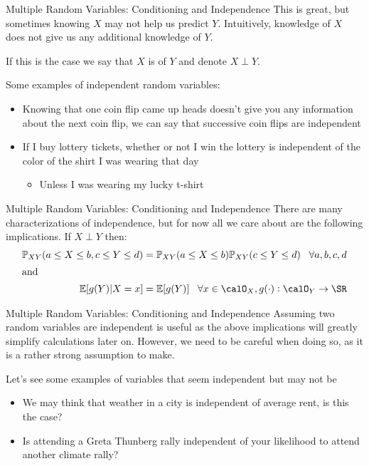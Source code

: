 \documentclass[notheorems,9pt]{beamer}
\begin{document}
\begin{frame}{Multiple Random Variables: Conditioning and Independence} 
	\label{frame:mrv-independence}
	This is great, but sometimes knowing \(X\) may not help us predict \(Y\). Intuitively, knowledge of \(X\) does not give us any additional knowledge of \(Y\). 

	If this is the case we say that \(X\) is  of \(Y\) and denote \(X\perp Y\).

	Some examples of independent random variables:
	\begin{itemize}
		\item<2-> Knowing that one coin flip came up heads doesn't give you any information about the next coin flip, we can say that successive coin flips are independent
		\item<3-> If I buy lottery tickets, whether or not I win the lottery is independent of the color of the shirt I was wearing that day
		\begin{itemize}
			\item<4-> Unless I was wearing my lucky t-shirt
		\end{itemize}
	\end{itemize}
\end{frame}
\begin{frame}{Multiple Random Variables: Conditioning and Independence} 
	\label{frame:mrv-indep-charac}
	There are many characterizations of independence, but for now all we care about are the following implications. If \(X\perp Y\) then:
	\begin{align*}
		\P_{XY}(a\leq X\leq b, c\leq Y\leq d) &= \P_{XY}(a\leq X\leq b)\P_{XY}(c\leq Y\leq d)\;\;\;\forall a,b,c,d\\
		\intertext{and}
		\E[g(Y)|X=x] &= \E[g(Y)]\;\;\;\forall x\in\calO_X, g(\cdot):\calO_Y\to\SR
	\end{align*}
\end{frame}
\begin{frame}{Multiple Random Variables: Conditioning and Independence} 
	\label{frame:mrc-indep-careful}
	Assuming two random variables are independent is useful as the above implications will greatly simplify calculations later on. However, we need to be careful when doing so, as it is a rather strong assumption to make.

	Let's see some examples of variables that seem independent but may not be
	\begin{itemize}
		\item We may think that weather in a city is independent of average rent, is this the case?
		\item Is attending a Greta Thunberg rally independent of your likelihood to attend another climate rally?
	\end{itemize}
\end{frame}
\end{document}
